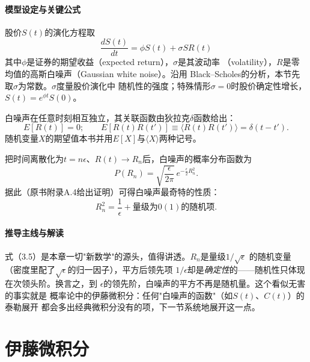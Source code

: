 \paragraph{模型设定与关键公式}
股价$S(t)$的演化方程取
\begin{equation*}
\frac{dS(t)}{dt}=\phi S(t)+\sigma S R(t)
\tag{3.2}
\end{equation*}
其中$\phi$是证券的期望收益（expected return），$\sigma$是其波动率
（volatility），$R$是零均值的高斯白噪声（Gaussian white noise）。沿用
Black--Scholes的分析，本节先取$\sigma$为常数。$\sigma$度量股价演化中
随机性的强度；特殊情形$\sigma=0$时股价确定性增长，$S(t)=e^{\phi t}S(0)$。

白噪声在任意时刻相互独立，其关联函数由狄拉克$\delta$函数给出：
\begin{equation*}
E[R(t)]=0;\qquad E[R(t)R(t')]\equiv\langle R(t)R(t')\rangle=\delta(t-t').
\tag{3.3}
\end{equation*}
随机变量$X$的期望值本书并用$E[X]$与$\langle X\rangle$两种记号。

把时间离散化为$t=n\epsilon$、$R(t)\to R_n$后，白噪声的概率分布函数为
\begin{equation*}
P(R_n)=\sqrt{\frac{\epsilon}{2\pi}}\,e^{-\frac{\epsilon}{2}R_n^{2}}.
\tag{3.4}
\end{equation*}
据此（原书附录A.4给出证明）可得白噪声最奇特的性质：
\begin{equation*}
R_n^{2}=\frac{1}{\epsilon}+\text{量级为}0(1)\text{的随机项}.
\tag{3.5}
\end{equation*}

\paragraph{推导主线与解读}
式（3.5）是本章一切"新数学"的源头，值得讲透。$R_n$是量级$1/\sqrt{\epsilon}$
的随机变量（密度里配了$\sqrt{\epsilon}$的归一因子），平方后领先项
$1/\epsilon$却是\emph{确定性}的——随机性只体现在次领头阶。换言之，到
$\epsilon$的领先阶，白噪声的平方不再是随机量。这个看似无害的事实就是
概率论中的伊藤微积分：任何"白噪声的函数"（如$S(t)$、$C(t)$）的泰勒展开
都会多出经典微积分没有的项，下一节系统地展开这一点。

\section{伊藤微积分}

